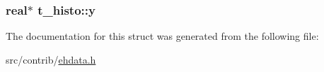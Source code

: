 \hypertarget{structt__histo_af2022210cbb5cd0225c34251dcd59da9}{
\subsubsection[{y}]{\setlength{\rightskip}{0pt plus 5cm}real$\ast$ {\bf t\-\_\-histo\-::y}}}\label{structt__histo_af2022210cbb5cd0225c34251dcd59da9}


\-The documentation for this struct was generated from the following file\-:\begin{DoxyCompactItemize}
\item 
src/contrib/\hyperlink{ehdata_8h}{ehdata.\-h}\end{DoxyCompactItemize}
